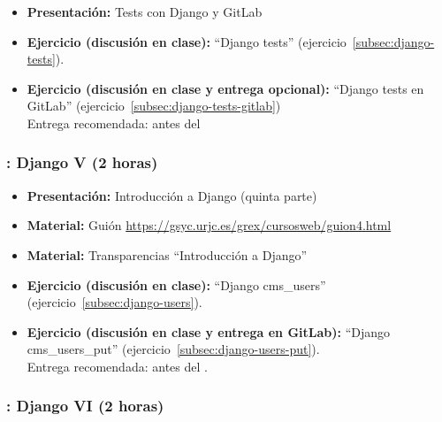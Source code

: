 \documentclass[a4paper,12pt]{article}
\begin{document}
\begin{itemize}
\item \textbf{Presentación:} Tests con Django y GitLab
\item \textbf{Ejercicio (discusión en clase):} ``Django tests'' (ejercicio~\ref{subsec:django-tests}).
\item \textbf{Ejercicio (discusión en clase y entrega opcional):} ``Django tests en GitLab'' (ejercicio~\ref{subsec:django-tests-gitlab}) \\
  Entrega recomendada: antes del \martesK
\end{itemize}


\subsubsection{\martesK: Django V (2 horas)}
\label{cal:martesK}

\begin{itemize}
 \item \textbf{Presentación:} Introducción a Django (quinta parte)
 \item \textbf{Material:} Guión \url{https://gsyc.urjc.es/grex/cursosweb/guion4.html}
 \item \textbf{Material:} Transparencias ``Introducción a Django''
 \item \textbf{Ejercicio (discusión en clase):} ``Django cms\_users'' (ejercicio~\ref{subsec:django-users}).
 \item \textbf{Ejercicio (discusión en clase y entrega en GitLab):} ``Django cms\_users\_put'' (ejercicio~\ref{subsec:django-users-put}). \\
  Entrega recomendada: antes del \martesL.
\end{itemize}

\subsubsection{\martesL: Django VI (2 horas)}
\label{cal:martesL}
\end{document}
